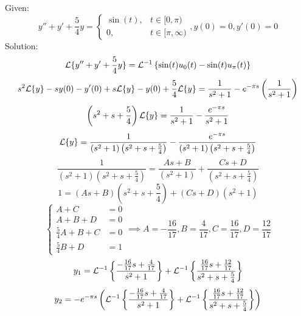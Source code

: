 \documentclass[diffeq.tex]{subfiles}
\begin{document}
\np
\begin{homework*}[268.6]
    Given:
    \begin{equation}
        y'' + y' + \frac{5}{4}y = \begin{cases}
            \sin(t), &t\in[0,\pi)\\
            0, &t\in[\pi,\infty)
        \end{cases}, y(0) = 0, y'(0) = 0
    \end{equation}
    Solution:
    \begin{equation}
        \mathcal{L}\{y'' + y' + \frac{5}{4}y\} = \mathcal{L}^{-1}\left\{\sin(t)u_{0}(t) - \sin(t)u_{\pi}(t)\right\}
    \end{equation}
    \begin{equation}
        s^{2}\mathcal{L}\{y\} - sy(0) - y'(0) + s\mathcal{L}\{y\} - y(0) + \frac{5}{4}\mathcal{L}\{y\} = \frac{1}{s^{2} + 1} - e^{-\pi s}\left(\frac{1}{s^{2} + 1}\right)
    \end{equation}
    \begin{equation}
        \left(s^{2} + s + \frac{5}{4}\right)\mathcal{L}\{y\} = \frac{1}{s^{2} + 1} - \frac{e^{-\pi s}}{s^{2} + 1}
    \end{equation}
    \begin{equation}
        \mathcal{L}\{y\} = \frac{1}{(s^{2} + 1)\left(s^{2} + s + \frac{5}{4}\right)} - \frac{e^{-\pi s}}{(s^{2} + 1)\left(s^{2} + s + \frac{5}{4}\right)}
    \end{equation}
    \begin{equation}
        \frac{1}{(s^{2} + 1)\left(s^{2} + s + \frac{5}{4}\right)} = \frac{As + B}{(s^{2} + 1)} + \frac{Cs + D}{\left(s^{2} + s + \frac{5}{4}\right)}
    \end{equation}
    \begin{equation}
        1 = (As + B)\left(s^{2} + s + \frac{5}{4}\right) + (Cs + D)(s^{2} + 1)
    \end{equation}
    \begin{equation}
        \begin{cases}
            A + C &= 0\\
            A + B + D &= 0\\
            \frac{5}{4}A + B + C &= 0\\
            \frac{5}{4}B + D &= 1
        \end{cases}
        \implies A = -\frac{16}{17}, B = \frac{4}{17}, C = \frac{16}{17}, D = \frac{12}{17}
    \end{equation}
    \begin{equation}
        y_{1} = \mathcal{L}^{-1}\left\{\frac{-\frac{16}{17}s + \frac{4}{17}}{s^{2} + 1}\right\} + \mathcal{L}^{-1}\left\{\frac{\frac{16}{17}s + \frac{12}{17}}{s^{2} + s + \frac{5}{4}}\right\}
    \end{equation}
    \begin{equation}
        y_{2} = -e^{-\pi s}\left(\mathcal{L}^{-1}\left\{\frac{-\frac{16}{17}s + \frac{4}{17}}{s^{2} + 1}\right\} + \mathcal{L}^{-1}\left\{\frac{\frac{16}{17}s + \frac{12}{17}}{s^{2} + s + \frac{5}{4}}\right\}\right)
    \end{equation}
\end{homework*}
\np
\end{document}
